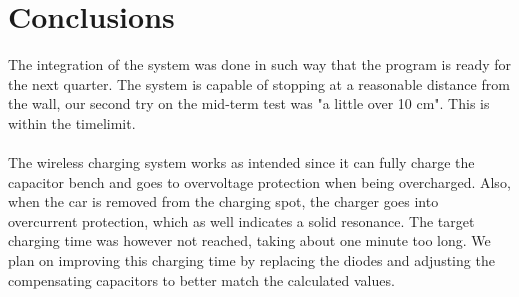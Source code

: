 \documentclass[final]{scrreprt} %
\begin{document}
\chapter{Conclusions}

The integration of the system was done in such way that the program is ready for the next quarter.
The system is capable of stopping at a reasonable distance from the wall, our second try on the mid-term test was "a little over 10 cm".
This is within the timelimit.
\\ \\
The wireless charging system works as intended since it can fully charge the capacitor bench and goes to overvoltage protection when being overcharged.
Also, when the car is removed from the charging spot, the charger goes into overcurrent protection, which as well indicates a solid resonance.
The target charging time was however not reached, taking about one minute too long.
We plan on improving this charging time by replacing the diodes and adjusting the compensating capacitors to better match the calculated values.
\end{document}
